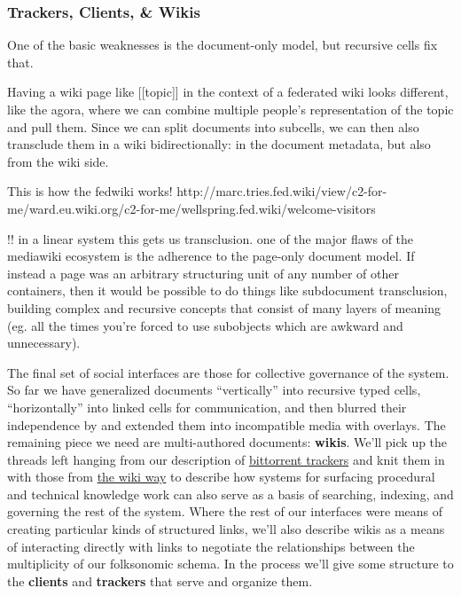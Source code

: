 \hypertarget{trackers-clients-wikis}{%
\subsubsection{Trackers, Clients, \&
Wikis}\label{trackers-clients-wikis}}

One of the basic weaknesses is the document-only model, but recursive
cells fix that.

Having a wiki page like {[}{[}topic{]}{]} in the context of a federated
wiki looks different, like the agora, where we can combine multiple
people's representation of the topic and pull them. Since we can split
documents into subcells, we can then also transclude them in a wiki
bidirectionally: in the document metadata, but also from the wiki side.

This is how the fedwiki works!
http://marc.tries.fed.wiki/view/c2-for-me/ward.eu.wiki.org/c2-for-me/wellspring.fed.wiki/welcome-visitors

!! in a linear system this gets us transclusion. one of the major flaws
of the mediawiki ecosystem is the adherence to the page-only document
model. If instead a page was an arbitrary structuring unit of any number
of other containers, then it would be possible to do things like
subdocument transclusion, building complex and recursive concepts that
consist of many layers of meaning (eg. all the times you're forced to
use subobjects which are awkward and unnecessary).

The final set of social interfaces are those for collective governance
of the system. So far we have generalized documents ``vertically'' into
recursive typed cells, ``horizontally'' into linked cells for
communication, and then blurred their independence by and extended them
into incompatible media with overlays. The remaining piece we need are
multi-authored documents: \textbf{wikis}. We'll pick up the threads left
hanging from our description of
\protect\hyperlink{archives-need-communities}{bittorrent trackers} and
knit them in with those from \protect\hyperlink{the-wiki-way}{the wiki
way} to describe how systems for surfacing procedural and technical
knowledge work can also serve as a basis of searching, indexing, and
governing the rest of the system. Where the rest of our interfaces were
means of creating particular kinds of structured links, we'll also
describe wikis as a means of interacting directly with links to
negotiate the relationships between the multiplicity of our folksonomic
schema. In the process we'll give some structure to the \textbf{clients}
and \textbf{trackers} that serve and organize them.

